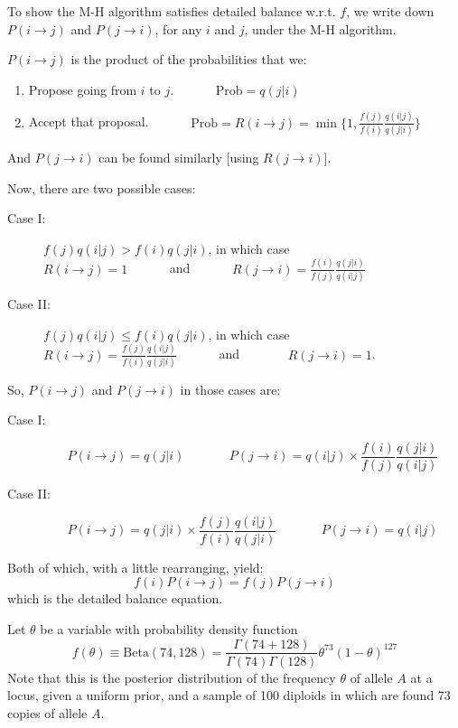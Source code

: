 To show the M-H algorithm satisfies detailed balance w.r.t. $f$, we write down $P(i\rightarrow  j)$ and $P(j\rightarrow i)$, for any $i$ and $j$, under the M-H algorithm.

$P(i\rightarrow j)$ is the product of the probabilities that we:
\begin{enumerate}
\item Propose going from $i$ to $j$. ~~~~~~$\mathrm{Prob} =  q(j|i)$
\item Accept that proposal.  ~~~~~~$\mathrm{Prob} = R(i\rightarrow j)=\min\{1,\frac{f(j)}{f(i)} \frac{q(i|j)}{q(j|i)}\} $
\end{enumerate}
And $P(j\rightarrow i)$ can be found similarly [using $R(j\rightarrow i)$].

Now, there are two possible cases:
\begin{description}
\item[Case I:~~] $f(j)q(i|j) > f(i)q(j|i)$,  in which case \\$R(i\rightarrow j)=1$ ~~~~~~and~~~~~~  
$R(j\rightarrow i)=\frac{f(i)}{f(j)} \frac{q(j|i)}{q(i|j)}$
\item[Case II:~~] $f(j)q(i|j) \leq f(i)q(j|i)$, in which case \\
$R(i\rightarrow j)=\frac{f(j)}{f(i)} \frac{q(i|j)}{q(j|i)}$ ~~~~~~and~~~~~~~ $R(j\rightarrow i)=1$. 
\end{description}





So, $P(i\rightarrow j)$ and $P(j\rightarrow i)$ in those cases are:
\begin{description}
\item[Case I:~~] 
\[
P(i\rightarrow j) = q(j|i)~~~~~~~~~~~~~~~~ P(j\rightarrow i) = q(i|j) \times \frac{f(i)}{f(j)} \frac{q(j|i)}{q(i|j)}
\]
\item[Case II:~~]
\[
P(i\rightarrow j) = q(j|i) \times \frac{f(j)}{f(i)} \frac{q(i|j)}{q(j|i)}
~~~~~~~~~~~~~~~~
P(j\rightarrow i) = q(i|j)
\]
\end{description}
Both of which, with a little rearranging, yield:
\[
f(i)P(i\rightarrow j) = f(j)P(j\rightarrow i)
\]
which is the detailed balance equation.

Let $\theta$ be a variable with probability density function
\[
	f(\theta)\equiv\mathrm{Beta}(74,128) = \frac{\Gamma(74+128)}
	{\Gamma(74)\Gamma(128)} \theta^{73} (1-\theta)^{127}
\]	
Note that this is the posterior distribution of the frequency $\theta$ of allele $A$ at a locus, given a uniform prior, and a sample of 100 diploids in which are found 73 copies of allele $A$.

